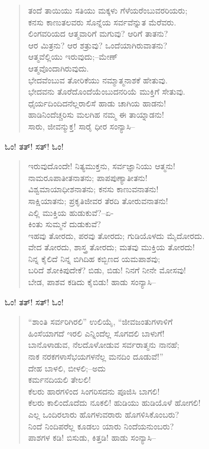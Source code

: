 \begin{verse}
ತಂದೆ ತಾಯಿಯು ಸತಿಯು ಮಕ್ಕಳು ಗೆಳೆಯರೆಂಬುವರರಿಯರು;\\ಕನಸು ಕಾಣುತಲವರು ಸೊನ್ನೆಯ ಸರ್ವವೆನ್ನುತ ಮೆರೆವರು.\\ಲಿಂಗವರಿಯದ ಆತ್ಮವಾರಿಗೆ ಮಗುವು? ಆರಿಗೆ ತಾತನು?\\ಆರ ಮಿತ್ರನು? ಆರ ಶತ್ರುವು? ಒಂದೆಯಾಗಿರುವಾತನು?\\ಆತ್ಮವೆಲ್ಲಿಯು ಇರುವುದು;–ಮೇಣ್\\ ಆತ್ಮವೊಂದಾಗಿರುವುದು.\\ಭೇದವೆಂಬುವ ತೋರಿಕೆಯು ನಮ್ಮಾತ್ಮನಾಶಕೆ ಹೇತುವು.\\ಭೇದವನು ತೊರೆದೊಂದೆಯೆಂಬುದನರಿಯೆ ಮುಕ್ತಿಗೆ ಸೇತುವು.\\ಧೈರ್ಯದಿಂದಿದನೆಲ್ಲರಾಲಿಸೆ ಹಾಡು ಚಾಗಿಯ ಹಾಡನು!\\ಹಾಡಿನಿಂದೆಚ್ಚರಿಸು ಮಲಗಿಹ ನಮ್ಮ ಈ ತಾಯ್ನಾಡನು!\\ಸಾರು, ಜೀವನ್ಮುಕ್ತ! ಸಾರೈ ಧೀರ ಸಂನ್ಯಾಸಿ–
\end{verse}

\begin{flushright}
ಓಂ! ತತ್! ಸತ್! ಓಂ!
\end{flushright}

\begin{verse}
ಇರುವುದೊಂದೇ! ನಿತ್ಯಮುಕ್ತನು, ಸರ್ವಜ್ಞಾನಿಯು ಆತ್ಮನು!\\ನಾಮರೂಪಾತೀತನಾತನು; ಪಾಪಪುಣ್ಯಾತೀತನು!\\ವಿಶ್ವಮಾಯಾಧೀಶನಾತನು; ಕನಸು ಕಾಣುವನಾತನು!\\ಸಾಕ್ಷಿಯಾತನು; ಪ್ರಕೃತಿಜೀವರ ತೆರದಿ ತೋರುವನಾತನು!\\ಎಲ್ಲಿ ಮುಕ್ತಿಯ ಹುಡುಕುವೆ?–ಏ-\\ಕಿಂತು ಸುಮ್ಮನೆ ದುಡುಕುವೆ?\\ಇಹವು ತೋರದು, ಪರವು ತೋರದು; ಗುಡಿಯೊಳದು ಮೈದೋರದು.\\ವೇದ ತೋರದು, ಶಾಸ್ತ್ರ ತೋರದು; ಮತವು ಮುಕ್ತಿಯ ತೋರದು!\\ನಿನ್ನ ಕೈಲಿದೆ ನಿನ್ನ ಬಿಗಿದಿಹ ಕಬ್ಬಿಣದ ಯಮಪಾಶವು;\\ಬರಿದೆ ಶೋಕಿಪುದೇಕೆ? ಬಿಡು, ಬಿಡು! ನಿನಗೆ ನೀನೇ ಮೋಸವು!\\ಬೇಡ, ಪಾಶವ ಕಡಿದು ಕೈಬಿಡು! ಹಾಡು ಸಂನ್ಯಾಸಿ–
\end{verse}

\begin{flushright}
ಓಂ! ತತ್! ಸತ್! ಓಂ!
\end{flushright}

\begin{verse}
“ಶಾಂತಿ ಸರ್ವರಿಗಿರಲಿ” ಉಲಿಯೈ, “ಜೀವಜಂತುಗಳಾಳಿಗೆ\\ಹಿಂಸೆಯಾಗದೆ ಇರಲಿ ಎನ್ನಿಂದೆಲ್ಲ ಸೊಗದಲಿ ಬಾಳುಗೆ!\\ಬಾನೊಳಾಡುವ, ನೆಲದೊಳೋಡುವ ಸರ್ವರಾತ್ಮನು ನಾನಹೆ;\\ನಾಕ ನರಕಗಳಾಸೆಭಯಗಳನೆಲ್ಲ ಮನದಿಂ ದೂಡುವೆ!”\\ದೇಹ ಬಾಳಲಿ, ಬೀಳಲಿ;–ಅದು\\ಕರ್ಮನದಿಯಲಿ ತೇಲಲಿ!\\ಕೆಲರು ಹಾರಗಳಿಂದ ಸಿಂಗರಿಸದನು ಪೂಜಿಸಿ ಬಾಗಲಿ!\\ಕೆಲರು ಕಾಲಿಂದೊದೆದು ನೂಕಲಿ! ಹುಡಿಯು ಹುಡಿಯೊಳೆ ಹೋಗಲಿ!\\ಎಲ್ಲ ಒಂದಿರಲಾರು ಹೊಗಳುವರಾರು ಹೊಗಳಿಸಿಕೊಂಬರು?\\ನಿಂದೆ ನಿಂದಿಪರೆಲ್ಲ ಕೂಡಲು ಯಾರು ನಿಂದೆಯನುಂಬರು?\\ಪಾಶಗಳ ಕಡಿ! ಬಿಸುಡು, ಕಿತ್ತಡಿ! ಹಾಡು ಸಂನ್ಯಾಸಿ–
\end{verse}

